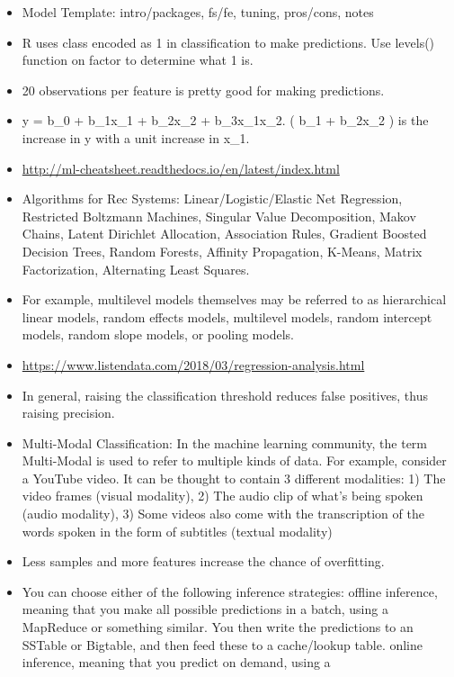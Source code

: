 \documentclass[]{book}
\theoremstyle{definition}
\theoremstyle{definition}
\theoremstyle{definition}
\theoremstyle{remark}
\begin{document}
\begin{itemize}
\item
  Model Template: intro/packages, fs/fe, tuning, pros/cons, notes
\item
  R uses class encoded as 1 in classification to make predictions. Use
  levels() function on factor to determine what 1 is.
\item
  20 observations per feature is pretty good for making predictions.
\item
  y = b\_0 + b\_1x\_1 + b\_2x\_2 + b\_3x\_1x\_2. ( b\_1 + b\_2x\_2 ) is
  the increase in y with a unit increase in x\_1.
\item
  \url{http://ml-cheatsheet.readthedocs.io/en/latest/index.html}
\item
  Algorithms for Rec Systems: Linear/Logistic/Elastic Net Regression,
  Restricted Boltzmann Machines, Singular Value Decomposition, Makov
  Chains, Latent Dirichlet Allocation, Association Rules, Gradient
  Boosted Decision Trees, Random Forests, Affinity Propagation, K-Means,
  Matrix Factorization, Alternating Least Squares.
\item
  For example, multilevel models themselves may be referred to as
  hierarchical linear models, random effects models, multilevel models,
  random intercept models, random slope models, or pooling models.
\item
  \url{https://www.listendata.com/2018/03/regression-analysis.html}
\item
  In general, raising the classification threshold reduces false
  positives, thus raising precision.
\item
  Multi-Modal Classification: In the machine learning community, the
  term Multi-Modal is used to refer to multiple kinds of data. For
  example, consider a YouTube video. It can be thought to contain 3
  different modalities: 1) The video frames (visual modality), 2) The
  audio clip of what's being spoken (audio modality), 3) Some videos
  also come with the transcription of the words spoken in the form of
  subtitles (textual modality)
\item
  Less samples and more features increase the chance of overfitting.
\item
  You can choose either of the following inference strategies: offline
  inference, meaning that you make all possible predictions in a batch,
  using a MapReduce or something similar. You then write the predictions
  to an SSTable or Bigtable, and then feed these to a cache/lookup
  table. online inference, meaning that you predict on demand, using a

\end{itemize}
\end{document}
